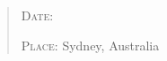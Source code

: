 {\begin{quote}
\vspace{0.35cm}
\noindent 
\hspace{-0.75cm}\textsc{Date: } \DTMdate{\utsyear-\utsmonth-\utsday}

\noindent 
\hspace{-0.75cm}\textsc{Place: } Sydney, Australia

\end{quote}
}
\clearpage
